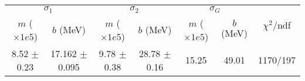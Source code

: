 \begin{tabular}{cc|cc|cc||c}
\multicolumn{2}{c|}{$\sigma_1$} & \multicolumn{2}{|c}{$\sigma_2$} & \multicolumn{2}{|c}{$\sigma_G$}  & \multirow{2}{*}{$\chi^2/$ndf}\\
$m$ ($\times1e5$) & $b$ (MeV) & $m$ ($\times1e5$) & $b$ (MeV) & $m$ ($\times1e5$) & $b$ (MeV) & \\
\hline
8.52 $\pm$ 0.23 & 17.162 $\pm$ 0.095 & 9.78 $\pm$ 0.38 & 28.78 $\pm$ 0.16 & 15.25 & 49.01 & 1170/197\\
\end{tabular}
